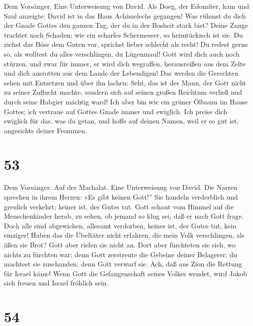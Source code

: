  Dem Vorsänger. Eine Unterweisung von David. Als Doeg, der
Edomiter, kam und Saul anzeigte: David ist in das Haus Achimelechs
gegangen! Was rühmst du dich der Gnade Gottes den ganzen Tag, der du in
der Bosheit stark bist?  Deine Zunge trachtet nach
Schaden; wie ein scharfes Schermesser, so heimtückisch ist sie.
 Du ziehst das Böse dem Guten vor, sprichst lieber
schlecht als recht!  Du redest gerne so, als wolltest du
alles verschlingen, du Lügenmaul!  Gott wird dich auch
noch stürzen, und zwar für immer, er wird dich wegraffen, herausreißen
aus dem Zelte und dich ausrotten aus dem Lande der Lebendigen!
 Das werden die Gerechten sehen mit Entsetzen und über ihn
lachen:  Seht, das ist der Mann, der Gott nicht zu seiner
Zuflucht machte, sondern sich auf seinen großen Reichtum verließ und
durch seine Habgier mächtig ward!  Ich aber bin wie ein
grüner Ölbaum im Hause Gottes; ich vertraue auf Gottes Gnade immer und
ewiglich.  Ich preise dich ewiglich für das, was du getan,
und hoffe auf deinen Namen, weil er so gut ist, angesichts deiner
Frommen.

\hypertarget{section-52}{%
\section{53}\label{section-52}}

 Dem Vorsänger. Auf der Machalat. Eine Unterweisung von
David. Die Narren sprechen in ihrem Herzen: «Es gibt keinen Gott!'' Sie
handeln verderblich und greulich verkehrt; keiner ist, der Gutes tut.
 Gott schaut vom Himmel auf die Menschenkinder herab, zu
sehen, ob jemand so klug sei, daß er nach Gott frage. 
Doch alle sind abgewichen, allesamt verdorben, keiner ist, der Gutes
tut, kein einziger!  Haben das die Übeltäter nicht
erfahren, die mein Volk verschlingen, als äßen sie Brot? Gott aber
riefen sie nicht an.  Dort aber fürchteten sie sich, wo
nichts zu fürchten war; denn Gott zerstreute die Gebeine deiner
Belagerer; du machtest sie zuschanden; denn Gott verwarf sie.
 Ach, daß aus Zion die Rettung für Israel käme! Wenn Gott
die Gefangenschaft seines Volkes wendet, wird Jakob sich freuen und
Israel fröhlich sein.

\hypertarget{section-53}{%
\section{54}\label{section-53}}

